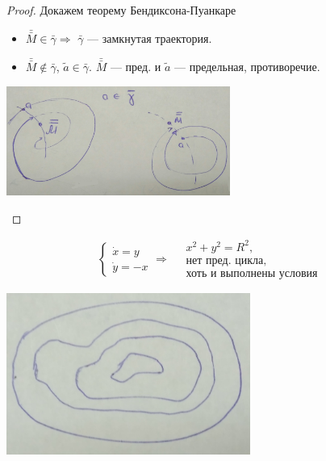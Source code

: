 \begin{proof}{ Докажем теорему Бендиксона-Пуанкаре}
\begin{itemize}
\begin{itemize}
								\item $\bar{\bar{M}}\in \bar{\gamma} \Rightarrow$ $\bar{\gamma}$ --- замкнутая траектория.
								\item  $\bar{\bar{M}} \notin \bar{\gamma}$, $\tilde{a}\in \bar{\gamma}$. 
								$\bar{\bar{M}}$ --- пред. и $\tilde{a}$ --- предельная, противоречие.						
						\end{itemize}
						\begin{center}\includegraphics[width=0.55\textwidth]{ch8/pict/pict_11.png}\vspace{5mm}\end{center} 
		\end{itemize}
	
	\end{proof}

	\begin{minipage}{0.4\textwidth}
		
		\begin{example}
		$$
			\begin{cases}
				\dot{x} = y \\
				\dot{y} =-x
			\end{cases} \Rightarrow  \quad  \begin{gathered} x^2+y^2 = R^2, \\ \text{нет пред. цикла,}\\ \text{хоть
									 и выполнены условия} \end{gathered} 
		$$
		\end{example}
	\end{minipage} 
		\hfill
	\begin{minipage}{0.4\textwidth}	
		\begin{center} \includegraphics[width=0.6\textwidth]{ch8/pict/pict_7.png} \vspace{5mm}\end{center} 
	\end{minipage} 	
	
